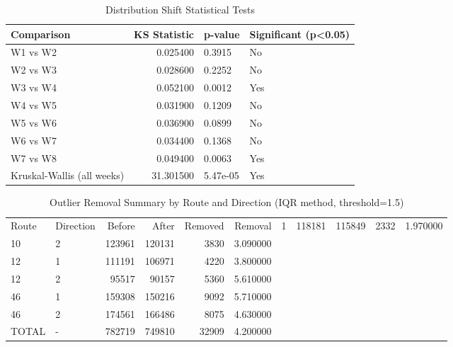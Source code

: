 \begin{table}
\caption{Distribution Shift Statistical Tests}
\label{tab:dist_shift_tests}
\begin{tabular}{lrll}
\toprule
Comparison & KS Statistic & p-value & Significant (p<0.05) \\
\midrule
W1 vs W2 & 0.025400 & 0.3915 & No \\
W2 vs W3 & 0.028600 & 0.2252 & No \\
W3 vs W4 & 0.052100 & 0.0012 & Yes \\
W4 vs W5 & 0.031900 & 0.1209 & No \\
W5 vs W6 & 0.036900 & 0.0899 & No \\
W6 vs W7 & 0.034400 & 0.1368 & No \\
W7 vs W8 & 0.049400 & 0.0063 & Yes \\
Kruskal-Wallis (all weeks) & 31.301500 & 5.47e-05 & Yes \\
\bottomrule
\end{tabular}
\end{table}



\begin{table}
\caption{Outlier Removal Summary by Route and Direction (IQR method, threshold=1.5)}
\label{tab:outlier_removal}
\begin{tabular}{llrrrr}
\toprule
Route & Direction & Before & After & Removed & Removal %
 & 1 & 118181 & 115849 & 2332 & 1.970000 \\
10 & 2 & 123961 & 120131 & 3830 & 3.090000 \\
12 & 1 & 111191 & 106971 & 4220 & 3.800000 \\
12 & 2 & 95517 & 90157 & 5360 & 5.610000 \\
46 & 1 & 159308 & 150216 & 9092 & 5.710000 \\
46 & 2 & 174561 & 166486 & 8075 & 4.630000 \\
TOTAL & - & 782719 & 749810 & 32909 & 4.200000 \\
\bottomrule
\end{tabular}
\end{table}



